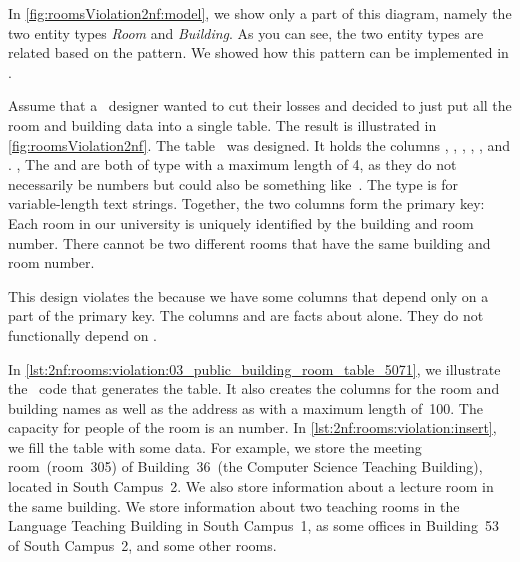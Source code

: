 %
%
%
%
%
In \cref{fig:roomsViolation2nf:model}, we show only a part of this diagram, namely the two entity types \emph{Room} and \emph{Building}.
As you can see, the two entity types are related based on the  pattern.
We showed how this pattern can be implemented in .

Assume that a \db\ designer wanted to cut their losses and decided to just put all the room and building data into a single table.
The result is illustrated in \cref{fig:roomsViolation2nf}.
The table~ was designed.
It holds the columns , , , , , and .
, 
The  and  are both of type  with a maximum length of 4, as they do not necessarily be numbers but could also be something like~.
The type  is for variable-length text strings.
Together, the two columns form the primary key:
Each room in our university is uniquely identified by the building and room number.
There cannot be two different rooms that have the same building and room number.

This design violates the  because we have some columns that depend only on a part of the primary key.
The columns  and  are facts about  alone.
They do not functionally depend on .

In \cref{lst:2nf:rooms:violation:03_public_building_room_table_5071}, we illustrate the \sql\ code that generates the table.
It also creates the columns for the room and building names as well as the address as  with a maximum length of~100.
The capacity for people of the room is an  number.
In \cref{lst:2nf:rooms:violation:insert}, we fill the table with some data.
For example, we store the meeting room~(room~305) of Building~36~(the Computer Science Teaching Building), located in South Campus~2.
We also store information about a lecture room in the same building.
We store information about two teaching rooms in the Language Teaching Building in South Campus~1, as some offices in Building~53 of South Campus~2, and some other rooms.

